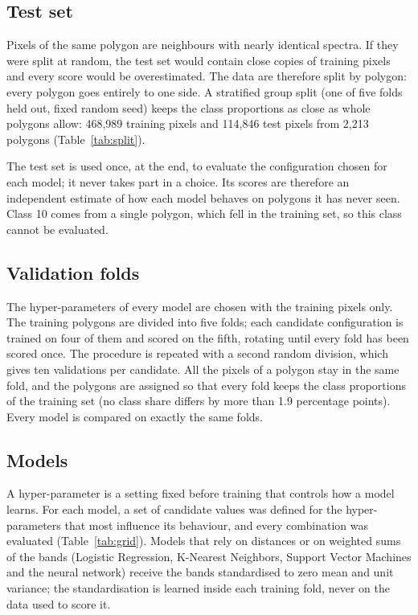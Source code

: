 \documentclass[11pt,a4paper]{article}
\begin{document}
\subsection{Test set}

Pixels of the same polygon are neighbours with nearly identical spectra. If
they were split at random, the test set would contain close copies of
training pixels and every score would be overestimated. The data are
therefore split by polygon: every polygon goes entirely to one side. A
stratified group split (one of five folds held out, fixed random seed) keeps
the class proportions as close as whole polygons allow: 468,989 training
pixels and 114,846 test pixels from 2,213 polygons (Table~\ref{tab:split}).

\begin{table}[H]
\centering\small
\caption{Train and test split by polygon.}
\label{tab:split}

\end{table}

The test set is used once, at the end, to evaluate the configuration chosen
for each model; it never takes part in a choice. Its scores are therefore an
independent estimate of how each model behaves on polygons it has never
seen. Class 10 comes from a single polygon, which fell in the training set,
so this class cannot be evaluated.

\subsection{Validation folds}

The hyper-parameters of every model are chosen with the training pixels only.
The training polygons are divided into five folds; each candidate
configuration is trained on four of them and scored on the fifth, rotating
until every fold has been scored once. The procedure is repeated with a
second random division, which gives ten validations per candidate. All the
pixels of a polygon stay in the same fold, and the polygons are assigned so
that every fold keeps the class proportions of the training set (no class
share differs by more than 1.9 percentage points). Every model is compared on
exactly the same folds.

\subsection{Models}

A hyper-parameter is a setting fixed before training that controls how a
model learns. For each model, a set of candidate values was defined for the
hyper-parameters that most influence its behaviour, and every combination was
evaluated (Table~\ref{tab:grid}). Models that rely on distances or on
weighted sums of the bands (Logistic Regression, K-Nearest Neighbors, Support
Vector Machines and the neural network) receive the bands standardised to
zero mean and unit variance; the standardisation is learned inside each
training fold, never on the data used to score it.
\end{document}
